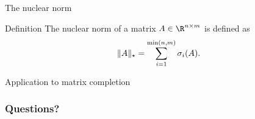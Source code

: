 \documentclass{beamer}
\begin{document}
\begin{frame}[t]{The nuclear norm}
	\grid

	\vspace{-0.4cm}
	\begin{block}{Definition}
		The nuclear norm of a matrix $A \in \R^{n \times m}$ is defined as
		$$
		\|A\|_{\star} = \sum_{i=1}^{\min(n,m)} \sigma_i(A).
	\vspace{-0.3cm}
		$$
	\end{block}
\end{frame}

\begin{frame}[t]{Application to matrix completion}
	\grid

	\pause
\end{frame}

\appendix
\backupbegin
\begin{frame}[t]
	\frametitle{Questions?}
	\grid

	\pause
\end{frame}
\backupend
\end{document}
